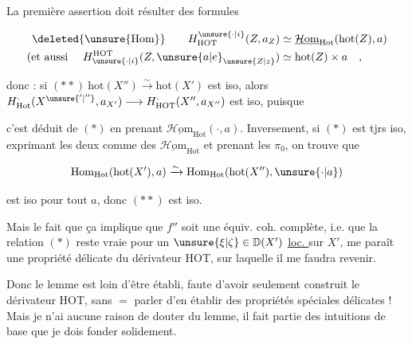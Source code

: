 

\margin{$\unsure{\ast|\times}$}

La première assertion doit résulter des formules

\[
\begin{aligned}
\deleted{\unsure{\mathrm{Hom}}}\qquad H^{\unsure{\cdot|i}}_{\mathrm{HOT}}(Z,a_Z)&\simeq\underline{\mathcal H\mathrm{om}}_{\mathrm{Hot}}(\mathrm{hot}(Z),a)\\
(\text{et aussi }\quad H_{\unsure{\cdot|i}}^{\mathrm{HOT}}(Z,\unsure{a|e}_{\unsure{Z|z}})&\simeq\mathrm{hot}(Z)\times a\quad ,
\end{aligned}
\]


donc : si $(**)\ \mathrm{hot}(X'')\xrightarrow{\sim}\mathrm{hot}(X')$ est iso, alors $H^{\cdot}_{\mathrm{Hot}}(X^{\unsure{'|''}},a_{X'})\longrightarrow H^{\cdot}_{\mathrm{HOT}}(X'',a_{X''})$ est iso, puisque

c'est déduit de $(*)$ en prenant $\underline{\mathcal H\mathrm{om}}_{\mathrm{Hot}}(\cdot,a)$. Inversement, si $(*)$ est tjrs iso,  \margin{$\longrightarrow$}exprimant les deux  comme des $\underline{\mathcal H\mathrm{om}}_{\mathrm{Hot}}$ et prenant les $\pi_0$, on trouve que

\[
\mathrm{Hom}_{\mathrm{Hot}}(\mathrm{hot}(X'),a)\xrightarrow{\sim}
\mathrm{Hom}_{\mathrm{Hot}}(\mathrm{hot}(X''),\unsure{\cdot|a})
\]

est iso pour tout $a$, donc $(**)$ est iso.

Mais le fait que ça implique que $f''$ soit une équiv.  coh. complète, i.e. que la relation $(*)$ reste vraie pour un $\unsure{\xi|\zeta}\in\mathbb D(X')$ \uline{loc. } sur $X'$, me paraît une  propriété délicate du dérivateur HOT, sur laquelle il me faudra revenir.

Donc le lemme est loin d'être établi, faute d'avoir seulement construit le dérivateur HOT, sans $=$ parler d'en établir des propriétés spéciales délicates ! Mais je n'ai aucune raison de douter du lemme, il fait partie  des intuitions de base que je  dois  fonder solidement.

